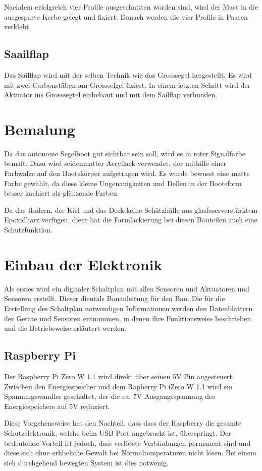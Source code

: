 Nachdem erfolgreich vier Profile ausgeschnitten worden sind, wird der Mast in die ausgesparte Kerbe gelegt und fixiert. Danach werden die vier Profile in Paaren verklebt.      

\subsection{Saailflap}
Das Sailflap wird mit der selben Technik wie das Grosssegel hergestellt. Es wird mit zwei Carbonstäben am Grossselgel fixiert. In einem letzten Schritt wird der Aktuator ins Grosssegtel einbebaut und mit dem Sailflap verbunden.   
\section{Bemalung}
Da das autonome Segelboot gut sichtbar sein soll, wird es in roter Signalfarbe bemalt. Dazu wird seidenmatter Acryllack verwendet, der mithilfe einer Farbwalze auf den Bootskörper aufgetragen wird. Es wurde bewusst  eine matte Farbe  gewählt, da diese kleine Ungenauigkeiten und Dellen in der Bootsform besser kachiert als glänzende Farben. 

Da das Rudern, der Kiel und das Deck keine Schützhülle aus glasfaserverstärktem Epoxidharz verfügen, dient hat die Farmlackierung bei diesen Bauteilen auch eine Schutzfunktion.
\section{Einbau der Elektronik}
Als erstes wird ein digitaler Schaltplan mit allen Sensoren und Aktuatoren und Sensoren erstellt. Dieser dientals Bauanleitung für den Bau. Die für die Erstellung des Schaltplan notwendigen Informationen werden den Datenblättern der Geräte und  Sensoren entnommen, in denen ihre Funktionsweise beschrieben und die Betriebsweise erläutert werden.
\subsection{Raspberry Pi}
Der Raspberry Pi Zero W 1.1 wird direkt über seinen 5V Pin angesteuert. Zwischen den Energiespeicher und dem Rapberry Pi iZero W 1.1 wird ein Spannungswandler geschaltet, der die ca. 7V Ausgangsspannung des Energiespeichers auf 5V reduziert.

Diese Vorgehensweise hat den Nachteil, dass dass der Raspberry die gesamte Schutzelektronik, welche beim USB Port angebracht ist, überspringt. Der bedeutende Vorteil ist jedoch, dass verlötete Verbindungen  permanent sind und diese sich ohne erhbeliche Gewalt bei Normaltemperaturen nicht lösen. Bei einem sich durchgehend bewegten System ist dies notwenig. 

